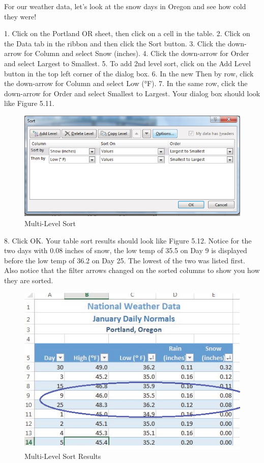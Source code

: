 For our weather data, let’s look at the snow days in Oregon and see how cold they were!

1.   Click on the Portland OR sheet, then click on a cell in the table.
2.   Click on the Data tab in the ribbon and then click the Sort button.
3.   Click the down-arrow for Column and select Snow (inches).
4.   Click the down-arrow for Order and select Largest to Smallest.
5.   To add 2nd level sort, click on the Add Level button in the top left corner of the dialog box.
6.   In the new Then by row, click the down-arrow for Column and select Low (°F).
7.   In the same row, click the down-arrow for Order and select Smallest to Largest. Your dialog box
should look like Figure 5.11.

\begin{figure}[H]
	\centering
	\includegraphics[width=\maxwidth{.95\linewidth}]{gfx/ch05_fig11}
	\caption{Multi-Level Sort}
	\label{05:fig11}
\end{figure}






8. Click OK. Your table sort results should look like Figure 5.12. Notice for the two days with 0.08
inches of snow, the low temp of 35.5 on Day 9 is displayed before the low temp of 36.2 on Day
25. The lowest of the two was listed first. Also notice that the filter arrows changed on the
sorted columns to show you how they are sorted.


\begin{figure}[H]
	\centering
	\includegraphics[width=\maxwidth{.95\linewidth}]{gfx/ch05_fig12}
	\caption{Multi-Level Sort Results}
	\label{05:fig12}
\end{figure}






